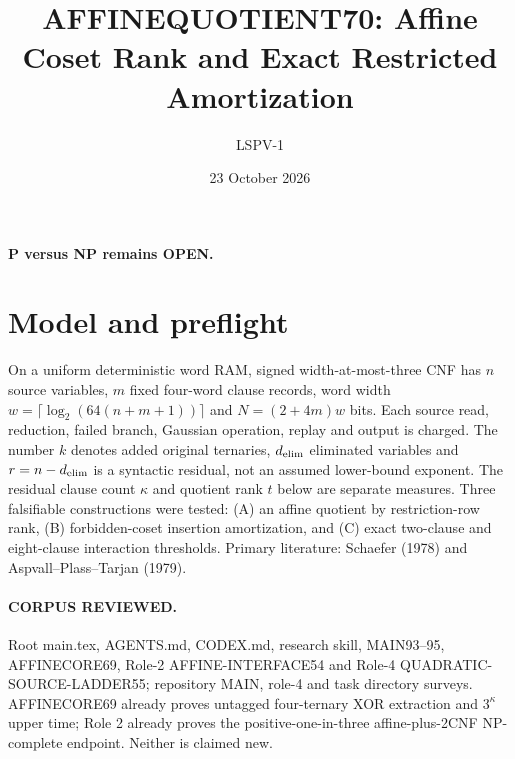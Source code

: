 \documentclass[11pt]{article}
\title{AFFINEQUOTIENT70: Affine Coset Rank and Exact Restricted Amortization}
\author{LSPV-1}
\date{23 October 2026}
\begin{document}
\maketitle
\begin{center}\textbf{P versus NP remains OPEN.}\end{center}
\section{Model and preflight}
On a uniform deterministic word RAM, signed width-at-most-three CNF has $n$ source variables, $m$ fixed four-word clause records, word width $w=\lceil\log_2(64(n+m+1))\rceil$ and $N=(2+4m)w$ bits. Each source read, reduction, failed branch, Gaussian operation, replay and output is charged. The number $k$ denotes added original ternaries, $d_{\rm elim}$ eliminated variables and $r=n-d_{\rm elim}$ is a syntactic residual, not an assumed lower-bound exponent. The residual clause count $\kappa$ and quotient rank $t$ below are separate measures.
Three falsifiable constructions were tested: (A) an affine quotient by restriction-row rank, (B) forbidden-coset insertion amortization, and (C) exact two-clause and eight-clause interaction thresholds. Primary literature: Schaefer (1978) and Aspvall--Plass--Tarjan (1979).
\paragraph{CORPUS REVIEWED.} Root main.tex, AGENTS.md, CODEX.md, research skill, MAIN93--95, AFFINECORE69, Role-2 AFFINE-INTERFACE54 and Role-4 QUADRATIC-SOURCE-LADDER55; repository MAIN, role-4 and task directory surveys. AFFINECORE69 already proves untagged four-ternary XOR extraction and $3^\kappa$ upper time; Role 2 already proves the positive-one-in-three affine-plus-2CNF NP-complete endpoint. Neither is claimed new.
\end{document}
